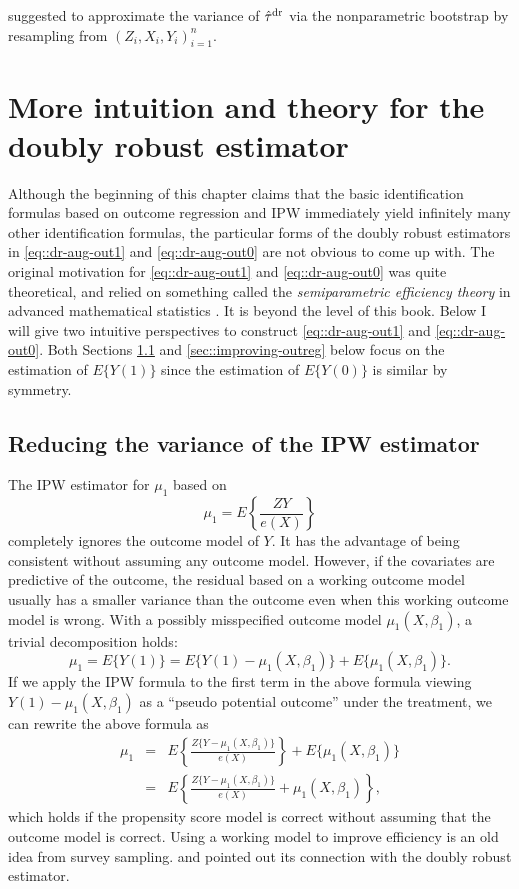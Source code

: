  
\citet{funk2011doubly} suggested to  approximate the variance of $\hat{\tau}^\textup{dr}$ via the nonparametric bootstrap by resampling from $(Z_i, X_i, Y_i)_{i=1}^n$.
 

\section{More intuition and theory for the doubly robust estimator}

Although the beginning of this chapter claims that the basic identification formulas based on outcome regression and IPW immediately yield infinitely many other identification formulas, the particular forms of the doubly robust estimators in \eqref{eq::dr-aug-out1} and \eqref{eq::dr-aug-out0} are not obvious to come up with. The original motivation for \eqref{eq::dr-aug-out1} and \eqref{eq::dr-aug-out0} was quite theoretical,  and relied on something called the {\it semiparametric efficiency theory} in advanced mathematical statistics \citep{bickel1993efficient}. It is beyond the level of this book. Below I will give two intuitive perspectives to construct \eqref{eq::dr-aug-out1} and \eqref{eq::dr-aug-out0}. Both Sections \ref{sec::improving-ipw} and \ref{sec::improving-outreg} below focus on the estimation of $E\{ Y(1) \}$ since the estimation of $E\{ Y(0) \}$ is similar by symmetry. 



\subsection{Reducing the variance of the IPW estimator}\label{sec::improving-ipw}


The IPW estimator for $\mu_1$ based on
$$
\mu_1 = E\left\{   \frac{ZY}{e(X)}   \right\}
$$
completely ignores the outcome model of $Y$. It has the advantage of being consistent without assuming any outcome model. However, if the covariates are predictive of the outcome, the residual based on a working outcome model usually has a smaller variance than the outcome even when this working outcome model is wrong. With a possibly misspecified outcome model $\mu_1(X, \beta_1)$, a trivial decomposition holds:
$$
\mu_1  = E\{ Y(1) \} = E\{ Y(1)  -\mu_1(X, \beta_1) \} + E\{\mu_1(X, \beta_1)\}.
$$
If we apply the IPW formula to the first term in the above formula viewing $Y(1)  -\mu_1(X, \beta_1)$ as a ``pseudo potential outcome'' under the treatment, we can rewrite the above formula as
\begin{eqnarray}
\mu_1  &=& E\left\{ \frac{Z \{Y  -\mu_1(X, \beta_1) \}}{e(X)} \right\} + E\{\mu_1(X, \beta_1)\}  \label{eq::explain-ipw-efficiency-basic}  \\
&=& E\left\{ \frac{Z \{Y  -\mu_1(X, \beta_1) \}}{e(X)}  +  \mu_1(X, \beta_1) \right\} ,\label{eq::explain-ipw-efficiency}
\end{eqnarray}
which holds if the propensity score model is correct without assuming that the outcome model is correct. Using a working model to improve efficiency is an old idea from survey sampling. \citet{little2004robust} and \citet{lumley2011connections} pointed out its connection with the doubly robust estimator.   



